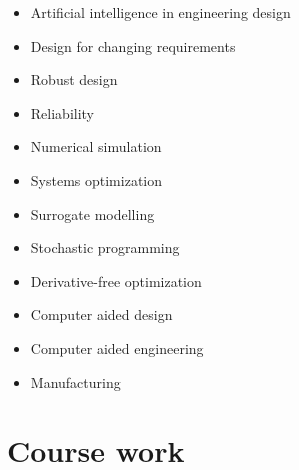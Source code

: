 \documentclass[10pt]{article} %
\begin{document}
\begin{paracol}{2} %

	\begin{itemize}\itemsep0em 
		\item Artificial intelligence in engineering design
		\item Design for changing requirements
		\item Robust design
		\item Reliability
		\item Numerical simulation
		\item Systems optimization
	\end{itemize}
		
	
	\switchcolumn %
	

	\begin{itemize}\itemsep0em 
		\item Surrogate modelling
		\item Stochastic programming
		\item Derivative-free optimization
		\item Computer aided design
		\item Computer aided engineering
		\item Manufacturing
	\end{itemize}

	
\end{paracol}


\section{Course work}



\setlength{} %
\end{document}
